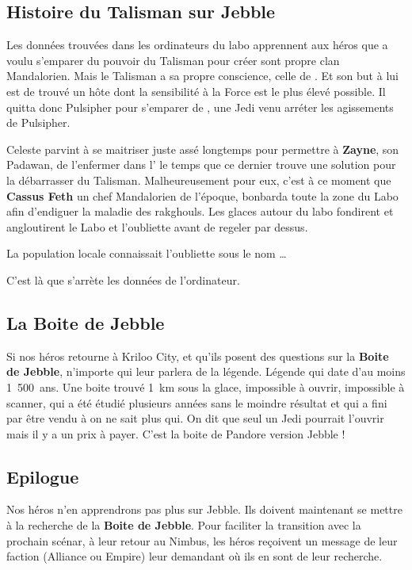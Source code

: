 \subsection{Histoire du Talisman sur Jebble}\label{sec:talisman-jebble}
Les données trouvées dans les ordinateurs du labo apprennent aux héros que  a voulu s’emparer du pouvoir du Talisman pour créer sont propre clan Mandalorien. Mais le Talisman a sa propre conscience, celle de . Et son but à lui est de trouvé un hôte dont la sensibilité à la Force est le plus élevé possible. Il quitta donc Pulsipher pour s’emparer de , une Jedi venu arréter les agissements de Pulsipher.

Celeste parvint à se maitriser juste assé longtemps pour permettre à \textbf{Zayne}, son Padawan, de l’enfermer dans l’ le temps que ce dernier trouve une solution pour la débarrasser du Talisman. Malheureusement pour eux, c’est à ce moment que \textbf{Cassus Feth} un chef Mandalorien de l'époque, bonbarda toute la zone du Labo afin d’endiguer la maladie des rakghouls. Les glaces autour du labo fondirent et angloutirent le Labo et l’oubliette avant de regeler par dessus.

La population locale connaissait l’oubliette sous le nom \ldots 

C’est là que s’arrète les données de l’ordinateur.

\subsection{La Boite de Jebble}
Si nos héros retourne à Kriloo City, et qu’ils posent des questions sur la \textbf{Boite de Jebble}, n’importe qui leur parlera de la légende. Légende qui date d’au moins 1~500~ans. Une boite trouvé 1~km sous la glace, impossible à ouvrir, impossible à scanner, qui a été étudié plusieurs années sans le moindre résultat et qui a fini par être vendu à on ne sait plus qui. On dit que seul un Jedi pourrait l’ouvrir mais il y a un prix à payer. C’est la boite de Pandore version Jebble !

\subsection{\’Epilogue}
Nos héros n’en apprendrons pas plus sur Jebble. Ils doivent maintenant se mettre à la recherche de la \textbf{Boite de Jebble}. Pour faciliter la transition avec la prochain scénar, à leur retour au Nimbus, les héros reçoivent un message de leur faction (Alliance ou Empire) leur demandant où ils en sont de leur recherche.

